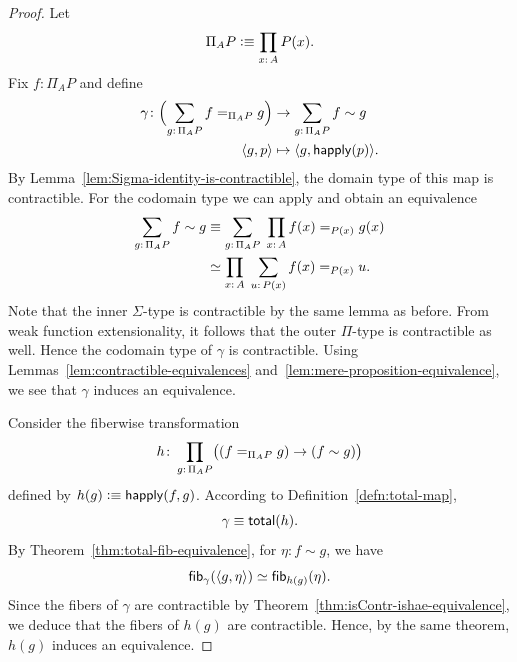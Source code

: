 \begin{proof}
    Let
    \[
        \Pi_AP\defeq\prod_{x\colon A}P(x).
    \]
    Fix $f\colon\Pi_AP$ and define
    \begin{align*}
        \gamma\colon\Bigl(
            \sum_{g\colon\Pi_AP}f\eq{\Pi_AP}g
        \Bigr)
        &\to
        \sum_{g\colon\Pi_AP}f\sim g\\
        \dep{g,p}
        &\mapsto\dep{g,\fun{happly}(p)}.
    \end{align*}
    By Lemma~\ref{lem:Sigma-identity-is-contractible}, the domain type of this map is contractible. For the codomain type we can apply  and obtain an equivalence
    \begin{align*}
        \sum_{g\colon\Pi_AP}f\sim g
            &\equiv\sum_{g\colon\Pi_AP}\;
                \prod_{x\colon A}f(x)\eq{P(x)}g(x)\\
            &\simeq\prod_{x\colon A}\;
                \sum_{u\colon P(x)}f(x)\eq{P(x)}u.
    \end{align*}
    Note that the inner $\Sigma$-type is contractible by the same lemma as before. From weak function extensionality, it follows that the outer $\Pi$-type is contractible as well. Hence the codomain type of $\gamma$ is contractible. Using Lemmas~\ref{lem:contractible-equivalences} and~\ref{lem:mere-proposition-equivalence}, we see that $\gamma$ induces an equivalence.

    Consider the fiberwise transformation
    \[
        h\colon\prod_{g\colon\Pi_AP}\bigl((f\eq{\Pi_AP}g)\to(f\sim g)\bigr)
    \]
    defined by $h(g)\mathrel{\vcentcolon}\equiv\mathsf{happly}(f,g)$. According to Definition~\ref{defn:total-map},
    \[
        \gamma\equiv\mathsf{total}(h).
    \]
    By Theorem~\ref{thm:total-fib-equivalence}, for $\eta\colon f\sim g$, we have
    \[
        \mathsf{fib}_\gamma(\langle g,\eta\rangle)
        \simeq
        \mathsf{fib}_{h(g)}(\eta).
    \]
    Since the fibers of $\gamma$ are contractible by Theorem~\ref{thm:isContr-ishae-equivalence}, we deduce that the fibers of $h(g)$ are contractible. Hence, by the same theorem, $h(g)$ induces an equivalence.
    
\end{proof}

